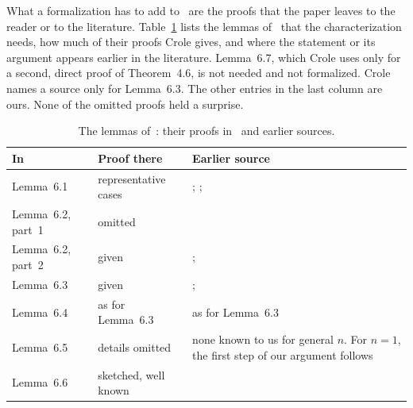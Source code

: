 What a formalization has to add to~\cite{crole2012a} are the proofs
that the paper leaves to the reader or to the literature.
Table~\ref{tab:gaps} lists the lemmas of~\cite[Section~6.1]{crole2012a}
that the characterization needs, how much of their proofs Crole gives,
and where the statement or its argument appears earlier in the
literature. Lemma~6.7, which Crole uses only for a second, direct proof
of Theorem~4.6, is not needed and not formalized. Crole names a source
only for Lemma~6.3. The other entries in the last column are ours.
None of the omitted proofs held a surprise.

\begin{table}[pos=tb]
\caption{The lemmas of~\cite[Section~6.1]{crole2012a}: their proofs
in~\cite{crole2012a} and earlier sources.}
\label{tab:gaps}
\small
\begin{tabular}{@{}llp{}@{}}
\toprule
In~\cite{crole2012a} & Proof there & Earlier source \\
\midrule
Lemma~6.1 & representative cases
  & \cite[proof of Proposition~2.2]{gabbay2002a};
    \cite[(9)]{urban2004a}; \cite[Theorem~4.4]{gabbay2011a} \\
Lemma~6.2, part~1 & omitted
  & \cite[Example~3.5(ii)]{gabbay2002a} \\
Lemma~6.2, part~2 & given
  & \cite[Lemma~2.8]{urban2004a}; \cite[Lemma~3.8]{gabbay2008a} \\
Lemma~6.3 & given
  & \cite[Lemma~5.16]{gabbay2011a}; \cite[Lemma~3.6(2)]{gabbay2008a} \\
Lemma~6.4 & as for Lemma~6.3 & as for Lemma~6.3 \\
Lemma~6.5 & details omitted
  & none known to us for general $n$. For $n = 1$, the first step of our
    argument follows \cite[Lemmas~A1.7, A1.8]{hindley2008a} \\
Lemma~6.6 & sketched, well known
  & \cite[Lemma~A1.5(g)]{hindley2008a} \\
\bottomrule
\end{tabular}
\end{table}
